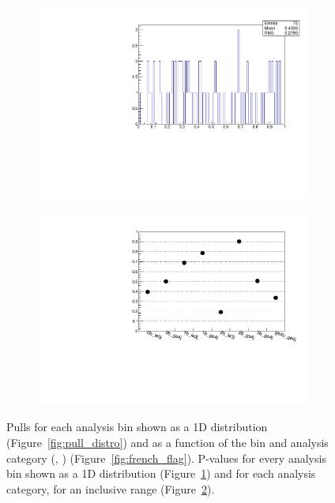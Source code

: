 \begin{figure}[h!]
  \begin{subfigure}[b]{0.46\textwidth}
    \includegraphics[width=\textwidth]{Figs/results/v0/pulls/pvalue_per_bin.pdf}
    \caption{}
    \label{fig:pvalue_distro}
  \end{subfigure}
  \begin{subfigure}[b]{0.46\textwidth}
    \includegraphics[width=\textwidth]{Figs/results/v0/pulls/pvalue_vs_cat.pdf}
    \caption{}
    \label{fig:pvalue_per_cat}
  \end{subfigure}
  \caption{Pulls for each analysis bin shown as a 1D distribution
  (Figure~\ref{fig:pull_distro}) and as a function of the \HT bin and analysis
  category (\nj, \nb) (Figure~\ref{fig:french_flag}). P-values for every
  analysis bin shown as a 1D distribution (Figure~\ref{fig:pvalue_distro}) and
  for each analysis category, for an inclusive \HT range
  (Figure~\ref{fig:pvalue_per_cat}).}
  \label{fig:pull_analysis}
\end{figure}

